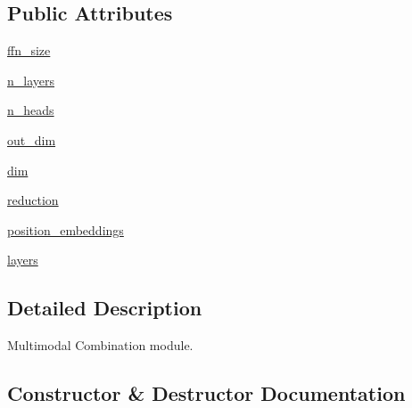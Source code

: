 \subsection*{Public Attributes}
\begin{DoxyCompactItemize}
\item 
\hyperlink{classprojects_1_1image__chat_1_1transresnet__multimodal_1_1modules_1_1MultimodalCombiner_a0af7352a16cba4f0c183a50193b33f78}{ffn\+\_\+size}
\item 
\hyperlink{classprojects_1_1image__chat_1_1transresnet__multimodal_1_1modules_1_1MultimodalCombiner_af1150161d16875a23fe10f61e7aa1cf8}{n\+\_\+layers}
\item 
\hyperlink{classprojects_1_1image__chat_1_1transresnet__multimodal_1_1modules_1_1MultimodalCombiner_a352d2c87e1084b8d3dfe15346d038184}{n\+\_\+heads}
\item 
\hyperlink{classprojects_1_1image__chat_1_1transresnet__multimodal_1_1modules_1_1MultimodalCombiner_ae9db59ed18feccfecfb4c96701c21839}{out\+\_\+dim}
\item 
\hyperlink{classprojects_1_1image__chat_1_1transresnet__multimodal_1_1modules_1_1MultimodalCombiner_aca0caa4e6262ec061a318348d99e517b}{dim}
\item 
\hyperlink{classprojects_1_1image__chat_1_1transresnet__multimodal_1_1modules_1_1MultimodalCombiner_a51a70794d4a9d5b8d6b12515833bcad4}{reduction}
\item 
\hyperlink{classprojects_1_1image__chat_1_1transresnet__multimodal_1_1modules_1_1MultimodalCombiner_a522ea58558cd910ec642c618503b1ccc}{position\+\_\+embeddings}
\item 
\hyperlink{classprojects_1_1image__chat_1_1transresnet__multimodal_1_1modules_1_1MultimodalCombiner_aeb5eb46560988ba57f2577c52058b07c}{layers}
\end{DoxyCompactItemize}


\subsection{Detailed Description}
\begin{DoxyVerb}Multimodal Combination module.
\end{DoxyVerb}
 

\subsection{Constructor \& Destructor Documentation}
\mbox{\label{classprojects_1_1image__chat_1_1transresnet__multimodal_1_1modules_1_1MultimodalCombiner_a5587602df98b09e9f8871eab1d0d0fa4}} 
